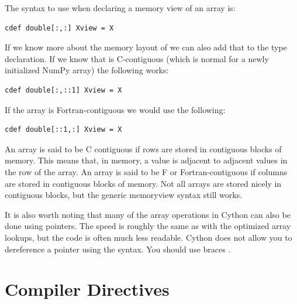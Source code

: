 The syntax to use when declaring a memory view of an array  is:
\begin{lstlisting}
cdef double[:,:] Xview = X
\end{lstlisting}
If we know more about the memory layout of  we can also add that to the type declaration.
If we know that  is C-contiguous (which is normal for a newly initialized NumPy array) the following works:
\begin{lstlisting}
cdef double[:,::1] Xview = X
\end{lstlisting}
If the array is Fortran-contiguous we would use the following:
\begin{lstlisting}
cdef double[::1,:] Xview = X
\end{lstlisting}
An array is said to be C contiguous if rows are stored in contiguous blocks of memory.
This means that, in memory, a value is adjacent to adjacent values in the row of the array.
An array is said to be F or Fortran-contiguous if columns are stored in contiguous blocks of memory.
Not all arrays are stored nicely in contiguous blocks, but the generic memoryview syntax still works.

It is also worth noting that many of the array operations in Cython can also be done using pointers.
The speed is roughly the same as with the optimized array lookups, but the code is often much less readable.
Cython does not allow you to dereference a pointer using the \li{*} syntax.
You should use braces \li{[ ]}.

\section*{Compiler Directives}

